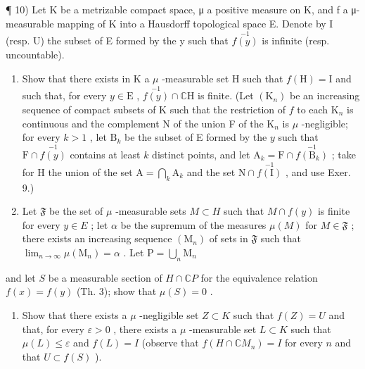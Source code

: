 ¶ 10) Let K be a metrizable compact space, μ a positive measure on K, and f a μ-measurable mapping of K into a Hausdorff topological space E. Denote by I (resp. U) the subset of E formed by the y such that \(\stackrel{-1}{f(y)}\) is infinite (resp. uncountable).

\begin{enumerate}
\def\labelenumi{\alph{enumi})}
\item
  Show that there exists in K a \(\mu\) -measurable set H such that \(f(\mathrm{H}) = \mathrm{I}\) and such that, for every \(y \in \mathrm{E}\) , \(\stackrel{-1}{f(y)} \cap \mathbb{C}\mathrm{H}\) is finite. (Let \((\mathrm{K}_n)\) be an increasing sequence of compact subsets of K such that the restriction of \(f\) to each \(\mathrm{K}_n\) is continuous and the complement N of the union F of the \(\mathrm{K}_n\) is \(\mu\) -negligible; for every \(k > 1\) , let \(\mathrm{B}_k\) be the subset of E formed by the \(y\) such that \(\mathrm{F} \cap \stackrel{-1}{f(y)}\) contains at least \(k\) distinct points, and let \(\mathrm{A}_k = \mathrm{F} \cap \stackrel{-1}{f(\mathrm{B}_k)}\) ; take for H the union of the set \(\mathrm{A} = \bigcap_k \mathrm{A}_k\) and the set \(\mathrm{N} \cap \stackrel{-1}{f(\mathrm{I})}\) , and use Exer. 9.)
\item
  Let \(\mathfrak{F}\) be the set of \(\mu\) -measurable sets \(M \subset H\) such that \(M \cap f(y)\) is finite for every \(y \in E\) ; let \(\alpha\) be the supremum of the measures \(\mu(M)\) for \(M \in \mathfrak{F}\) ; there exists an increasing sequence \((\mathrm{M}_n)\) of sets in \(\mathfrak{F}\) such that \(\lim_{n\to \infty}\mu (\mathrm{M}_n) = \alpha\) . Let \(\mathrm{P} = \bigcup_{n}\mathrm{M}_{n}\)
\end{enumerate}

and let \(S\) be a measurable section of \(H \cap \mathbb{C}P\) for the equivalence relation \(f(x) = f(y)\) (Th. 3); show that \(\mu(S) = 0\) .

\begin{enumerate}
\def\labelenumi{\alph{enumi})}
\setcounter{enumi}{2}
\tightlist
\item
  Show that there exists a \(\mu\) -negligible set \(Z \subset K\) such that \(f(Z) = U\) and that, for every \(\varepsilon > 0\) , there exists a \(\mu\) -measurable set \(L \subset K\) such that \(\mu(L) \leqslant \varepsilon\) and \(f(L) = I\) (observe that \(f(H \cap \mathbb{C}M_n) = I\) for every \(n\) and that \(U \subset f(S)\) ).
\end{enumerate}


